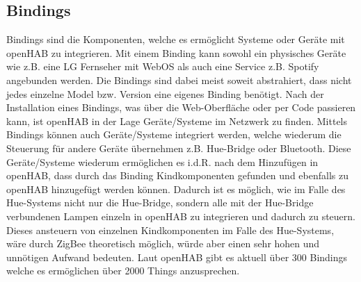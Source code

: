 \subsection{Bindings} \label{sec:Bindings}
Bindings sind die Komponenten, welche es ermöglicht Systeme oder Geräte mit openHAB zu integrieren. Mit einem Binding kann sowohl ein physisches Geräte wie z.B. eine LG Fernseher mit WebOS als auch eine Service z.B. Spotify angebunden werden. Die Bindings sind dabei meist soweit abstrahiert, dass nicht jedes einzelne Model bzw. Version eine eigenes Binding benötigt.
Nach der Installation eines Bindings, was über die Web-Oberfläche oder per Code passieren kann, ist openHAB in der Lage Geräte/Systeme im Netzwerk zu finden. Mittels Bindings können auch Geräte/Systeme integriert werden, welche wiederum die Steuerung für andere Geräte übernehmen z.B. Hue-Bridge oder Bluetooth. Diese Geräte/Systeme wiederum ermöglichen es i.d.R. nach dem Hinzufügen in openHAB, dass durch das Binding Kindkomponenten gefunden und ebenfalls zu openHAB hinzugefügt werden können. Dadurch ist es möglich, wie im Falle des Hue-Systems nicht nur die Hue-Bridge, sondern alle mit der Hue-Bridge verbundenen Lampen einzeln in openHAB zu integrieren und dadurch zu steuern. Dieses ansteuern von einzelnen Kindkomponenten im Falle des Hue-Systems, wäre durch ZigBee theoretisch möglich, würde aber einen sehr hohen und unnötigen Aufwand bedeuten. 
Laut openHAB gibt es aktuell über 300 Bindings welche es ermöglichen über 2000 Things anzusprechen.

